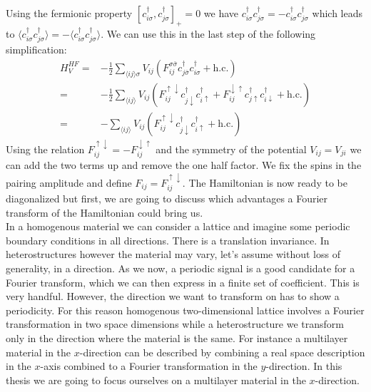 \documentclass[../main.tex]{subfile}
\begin{document}
Using the fermionic property $[c_{i\sigma}^{\dagger},c_{j\sigma}^{\dagger}]_+ = 0$ we have $c_{i\sigma}^{\dagger} c_{j\sigma}^{\dagger} = -c_{i\sigma}^{\dagger} c_{j\sigma}^{\dagger}$
which leads to $\langle  c_{i\sigma}^{\dagger} c_{j\sigma}^{\dagger} \rangle = -\langle c_{i\sigma}^{\dagger} c_{j\sigma}^{\dagger}\rangle$. We can use this in the last step of the following simplification:
\begin{equation}\label{eq:HF_V}
    \begin{aligned}
        H^{HF}_V =& -\frac{1}{2} \sum_{\langle ij\rangle \sigma} V_{ij} \left(F_{ij}^{\sigma \bar{\sigma}} c^{\dagger}_{j\bar{\sigma}}c^{\dagger}_{i\sigma} + \text{h.c.}\right)\\
            =& -\frac{1}{2}\sum_{\langle ij\rangle} V_{ij} \left(F_{ij}^{\uparrow \downarrow} c^{\dagger}_{j\downarrow}c^{\dagger}_{i\uparrow} + F_{ij}^{\downarrow\uparrow} c^{\dagger}_{j\uparrow}c^{\dagger}_{i\downarrow} + \text{h.c.}\right)\\
            =& -\sum_{\langle ij\rangle} V_{ij} \left(F_{ij}^{\uparrow \downarrow} c^{\dagger}_{j\downarrow}c^{\dagger}_{i\uparrow} + \text{h.c.}\right)
    \end{aligned}
\end{equation}
Using the relation $F_{ij}^{\uparrow\downarrow} = -F_{ij}^{\downarrow\uparrow}$ and the symmetry of the potential $V_{ij} = V_{ji}$ we can add the two terms up and remove the one half factor.
We fix the spins in the pairing amplitude and define $F_{ij} = F_{ij}^{\uparrow\downarrow}$.
The Hamiltonian is now ready to be diagonalized but first, we are going to discuss which advantages a Fourier transform of the Hamiltonian could bring us.\\
 
In a homogenous material we can consider a lattice and imagine some periodic boundary conditions in all directions. There is a translation invariance.
In heterostructures however the material may vary, let's assume
without loss of generality, in a direction. As we now, a periodic signal is a good candidate for a Fourier transform, which we can then express in a finite set of coefficient. This is very handful.
However, the direction we want to transform on has to show a periodicity. For this reason homogenous two-dimensional lattice involves a Fourier transformation in two space dimensions while a heterostructure
we transform only in the direction where the material is the same. For instance a multilayer material in the $x$-direction can be described by combining a real space description in the $x$-axis 
combined to a Fourier transformation in the $y$-direction.
In this thesis we are going to focus ourselves on a multilayer material in the $x$-direction.\\
\end{document}
